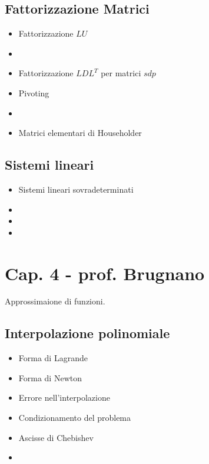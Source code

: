 \documentclass[a4paper, 12pt]{article}
\begin{document}
\subsection{Fattorizzazione Matrici}
	\begin{itemize}
		\item Fattorizzazione $LU$
		\subitem \color{blue}{costo computazionale} \color{black}
		\item \color{blue}{Matrici a diagonale dominante} \color{black}
		\item Fattorizzazione $LDL^T$ per matrici $sdp$
		\item Pivoting
		\item \color{blue}{Condizionamento del problema} \color{black}
		\item Matrici elementari di Householder
		\subitem \color{blue}{fattorizzazione $QR$} \color{black}
	\end{itemize}

\subsection{Sistemi lineari}
	\begin{itemize}
		\item Sistemi lineari sovradeterminati
		\item \color{blue}{Metodo di Jacobi} \color{black}
		\item \color{blue}{Metodo di Gauss-Seidel} \color{black}
		\item \color{blue}{Splitting regolari di matrici} \color{black}
	\end{itemize}

\vspace{0.5cm}

\section{Cap. 4 - prof. Brugnano}

Approssimaione di funzioni.

\subsection{Interpolazione polinomiale}
	\begin{itemize}
		\item Forma di Lagrande
		\item Forma di Newton
		\item Errore nell'interpolazione
		\item Condizionamento del problema
		\item Ascisse di Chebishev
		\item \color{green}{Polinomio interpolante di Hermite} \color{black}
	\end{itemize}
\end{document}
